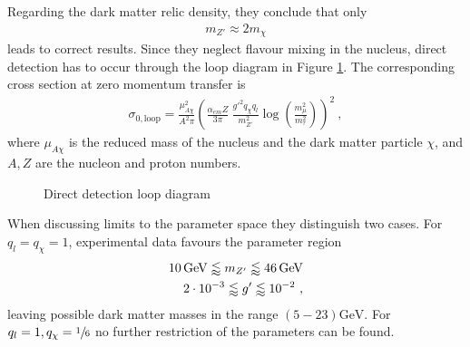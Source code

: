 \begin{minipage}{0.67\textwidth}
	Regarding the dark matter relic density, they conclude that only
	\begin{align}\label{eq:Relic}
	m_{Z'}\approx 2m_\chi
	\end{align}
	leads to correct results. Since they neglect flavour mixing in the nucleus, direct detection has to occur through the loop diagram in Figure \ref{fig:Loop}. The corresponding cross section at zero momentum transfer is
	\begin{align}\label{eq:Loop}
	\sigma_{0,\text{loop}} = \frac{\mu_{A\chi}^2}{A^2\pi}\left(\frac{\alpha_{em}Z}{3\pi}\ \frac{g'^2q_\chi q_l}{m_{Z'}^2}\log\left(\frac{m_\mu^2}{m_\tau^2}\right)\right)^2 \ ,
	\end{align}
	where $\mu_{A\chi}$ is the reduced mass of the nucleus and the dark matter particle $\chi$, and $A,Z$ are the nucleon and proton numbers.
\end{minipage} \hfill
\begin{minipage}{0.28\textwidth}
	\begin{figure}[H]
		\centering
		\resizebox{\textwidth}{!}{
				
		}
		\captionsetup{width=\textwidth}
		\caption{Direct detection loop diagram}
		\label{fig:Loop}
	\end{figure}
\end{minipage}
%
%	


When discussing limits to the parameter space they distinguish two cases. For $q_l=q_\chi=1$, experimental data favours the parameter region
\begin{align}\label{eq:Boundg}
	\SI{10}{\giga\electronvolt}\lessapprox m_{Z'}\lessapprox\SI{46}{\giga\electronvolt}\notag \\
	\SI{2e-3}{}\lessapprox g'\lessapprox\SI{e-2}{} \ ,
\end{align}
leaving possible dark matter masses in the range $(5-23)\si{\giga\electronvolt}$. For $q_l=1,q_\chi=\sfrac{1}{6}$ no further restriction of the parameters can be found.

